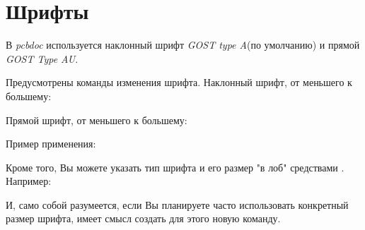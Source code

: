 
\section{Шрифты}

В \emph{pcbdoc} используется наклонный шрифт \emph{GOST type A}(по умолчанию) и
прямой \emph{GOST Type AU}.

Предусмотрены команды изменения шрифта. Наклонный шрифт, от меньшего к
большему:


Прямой шрифт, от меньшего к большему:


Пример применения:


Кроме того, Вы можете указать тип шрифта и его размер "в лоб" средствами
\XeLaTeX{}. Например:


И, само собой разумеется, если Вы планируете часто использовать конкретный размер
шрифта, имеет смысл создать для этого новую команду.

